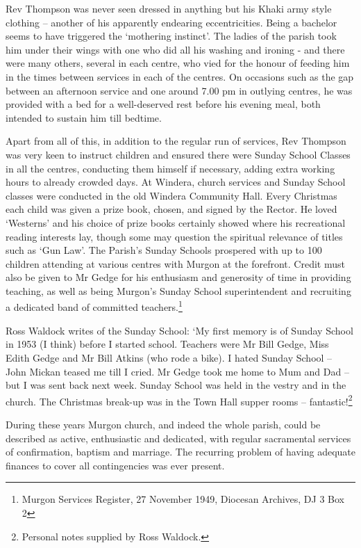 Rev Thompson was never seen dressed in anything but his Khaki army style clothing -- another of his apparently endearing eccentricities. Being a bachelor seems to have triggered the `mothering instinct'. The ladies of the parish took him under their wings with one who did all his washing and ironing - and there were many others, several in each centre, who vied for the honour of feeding him in the times between services in each of the centres. On occasions such as the gap between an afternoon service and one around 7.00 pm in outlying centres, he was provided with a bed for a well-deserved rest before his evening meal, both intended to sustain him till bedtime.

Apart from all of this, in addition to the regular run of services, Rev Thompson was very keen to instruct children and ensured there were Sunday School Classes in all the centres, conducting them himself if necessary, adding extra working hours to already crowded days. At Windera, church services and Sunday School classes were conducted in the old Windera Community Hall. Every Christmas each child was given a prize book, chosen, and signed by the Rector. He loved `Westerns' and his choice of prize books certainly showed where his recreational reading interests lay, though some may question the spiritual relevance of titles such as `Gun Law'. The Parish's Sunday Schools prospered with up to 100 children attending at various centres with Murgon at the forefront. Credit must also be given to Mr Gedge for his enthusiasm and generosity of time in providing teaching, as well as being Murgon's Sunday School superintendent and recruiting a dedicated band of committed teachers.\footnote{Murgon Services Register, 27 November 1949, Diocesan Archives, DJ 3 Box 2}

Ross Waldock writes of the Sunday School: `My first memory is of Sunday School in 1953 (I think) before I started school. Teachers were Mr Bill Gedge, Miss Edith Gedge and Mr Bill Atkins (who rode a bike). I hated Sunday School -- John Mickan teased me till I cried. Mr Gedge took me home to Mum and Dad -- but I was sent back next week. Sunday School was held in the vestry and in the church. The Christmas break-up was in the Town Hall supper rooms -- fantastic!\footnote{Personal notes supplied by Ross Waldock.}

During these years Murgon church, and indeed the whole parish, could be described as active, enthusiastic and dedicated, with regular sacramental services of confirmation, baptism and marriage. The recurring problem of having adequate finances to cover all contingencies was ever present.

